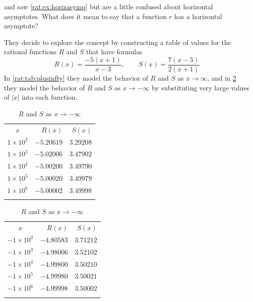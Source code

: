 	 \begin{pccexample}
		  and  saw \cref{rat:ex:horizasymp} but are a little confused
		 about horizontal asymptotes. What does it mean to say that a function $r$ has a horizontal
		 asymptote?

		 They decide to explore the concept by
		 constructing a table of values for the rational functions $R$ and  $S$ that have formulas
		 \[
			 R(x)=\frac{-5(x+1)}{x-3}, \qquad S(x)=\frac{7(x-5)}{2(x+1)}
		 \]
		 In \cref{rat:tab:plusinfty} they model the behavior of $R$ and $S$ as $x\rightarrow\infty$,
		 and in \cref{rat:tab:minusinfty} they model the behavior of $R$ and $S$ as $x\rightarrow-\infty$
		 by substituting very large values of $|x|$ into each function.
		 \begin{table}[!htb]
			 \begin{minipage}{.5\textwidth}
				 \centering
				 \caption{$R$ and $S$ as $x\rightarrow\infty$}
				 \label{rat:tab:plusinfty}
				 \begin{tabular}{crr}
					 \beforeheading
					 $x$            & $R(x)$     & $S(x)$    \\ \afterheading
					 $1\times 10^2$ & $-5.20619$ & $3.29208$ \\\normalline
					 $1\times 10^3$ & $-5.02006$ & $3.47902$ \\\normalline
					 $1\times 10^4$ & $-5.00200$ & $3.49790$ \\\normalline
					 $1\times 10^5$ & $-5.00020$ & $3.49979$ \\\normalline
					 $1\times 10^6$ & $-5.00002$ & $3.49998$ \\\lastline
				 \end{tabular}
			 \end{minipage}%
			 \begin{minipage}{.5\textwidth}
				 \centering
				 \caption{$R$ and $S$ as $x\rightarrow-\infty$}
				 \label{rat:tab:minusinfty}
				 \begin{tabular}{crr}
					 \beforeheading
					 $x$             & $R(x)$     & $S(x)$    \\ \afterheading
					 $-1\times 10^2$ & $-4.80583$ & $3.71212$ \\\normalline
					 $-1\times 10^3$ & $-4.98006$ & $3.52102$ \\\normalline
					 $-1\times 10^4$ & $-4.99800$ & $3.50210$ \\\normalline
					 $-1\times 10^5$ & $-4.99980$ & $3.50021$ \\\normalline
					 $-1\times 10^6$ & $-4.99998$ & $3.50002$ \\\lastline
				 \end{tabular}
			 \end{minipage}
		 \end{table}


\end{pccexample}
